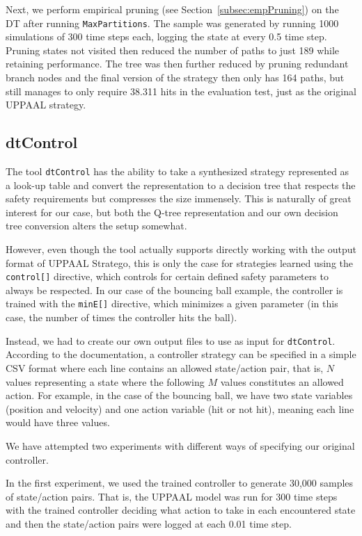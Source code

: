 \documentclass{article}
\begin{document}
Next, we perform empirical pruning (see Section~\ref{subsec:empPruning}) on the
DT after running \texttt{MaxPartitions}. The sample was generated by running
1000 simulations of 300 time steps each, logging the state at every 0.5 time step.
Pruning states not visited then reduced the number of paths to just 189 while
retaining performance.  The tree was then further reduced by pruning redundant
branch nodes and the final version of the strategy then only has 164 paths, but
still manages to only require 38.311 hits in the evaluation test, just as the
original UPPAAL strategy.


\subsection{dtControl}%
\label{subsec:dtControl}

The tool \texttt{dtControl} has the ability to take a synthesized strategy
represented as a look-up table and convert the representation to a decision
tree that respects the safety requirements but compresses the size immensely.
This is naturally of great interest for our case, but both the Q-tree
representation and our own decision tree conversion alters the setup somewhat.

However, even though the tool actually supports directly working with the output
format of UPPAAL Stratego, this is only the case for strategies learned using
the \texttt{control[]} directive, which controls for certain defined safety
parameters to always be respected. In our case of the bouncing ball example, the
controller is trained with the \texttt{minE[]} directive, which minimizes a
given parameter (in this case, the number of times the controller hits the
ball).

Instead, we had to create our own output files to use as input for
\texttt{dtControl}. According to the documentation, a controller strategy can be
specified in a simple CSV format where each line contains an allowed
state/action pair, that is, $N$ values representing a state where the following
$M$ values constitutes an allowed action. For example, in the case of the
bouncing ball, we have two state variables (position and velocity) and one action
variable (hit or not hit), meaning each line would have three values.

We have attempted two experiments with different ways of specifying our original
controller.

In the first experiment, we used the trained controller to generate 30,000
samples of state/action pairs. That is, the UPPAAL model was run for 300
time steps with the trained controller deciding what action to take in each
encountered state and then the state/action pairs were logged at each 0.01
time step.
\end{document}
